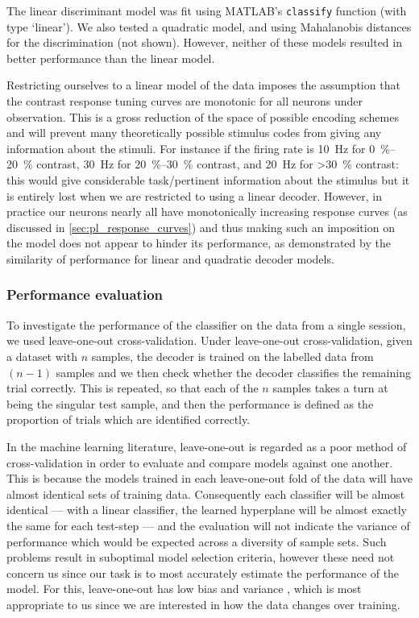 The linear discriminant model was fit using MATLAB's \texttt{classify} function (with type `linear').
We also tested a quadratic model, and using Mahalanobis distances for the discrimination (not shown).
However, neither of these models resulted in better performance than the linear model.

Restricting ourselves to a linear model of the data imposes the assumption that the contrast response tuning curves are monotonic for all neurons under observation.
This is a gross reduction of the space of possible encoding schemes and will prevent many theoretically possible stimulus codes from giving any information about the stimuli.
For instance if the firing rate is \SI{10}{Hz} for \SIrange{0}{20}{\percent} contrast, \SI{30}{Hz} for \SIrange{20}{30}{\percent} contrast, and \SI{20}{Hz} for \SI{>30}{\percent} contrast: this would give considerable task\-/pertinent information about the stimulus but it is entirely lost when we are restricted to using a linear decoder.
However, in practice our neurons nearly all have monotonically increasing response curves (as discussed in \autoref{sec:pl_response_curves}) and thus making such an imposition on the model does not appear to hinder its performance, as demonstrated by the similarity of performance for linear and quadratic decoder models.


\subsubsection{Performance evaluation}
\label{sec:pl_decoder_evaluation}

To investigate the performance of the classifier on the data from a single session, we used leave-one-out cross-validation.
Under leave-one-out cross-validation, given a dataset with $n$ samples, the decoder is trained on the labelled data from $(n-1)$ samples and we then check whether the decoder classifies the remaining trial correctly.
This is repeated, so that each of the $n$ samples takes a turn at being the singular test sample, and then the performance is defined as the proportion of trials which are identified correctly.

In the machine learning literature, leave-one-out is regarded as a poor method of cross-validation in order to evaluate and compare models against one another.
This is because the models trained in each leave-one-out fold of the data will have almost identical sets of training data.
Consequently each classifier will be almost identical --- with a linear classifier, the learned hyperplane will be almost exactly the same for each test-step --- and the evaluation will not indicate the variance of performance which would be expected across a diversity of sample sets.
Such problems result in suboptimal model selection criteria, however these need not concern us since our task is to most accurately estimate the performance of the model.
For this, leave-one-out has low bias and variance \citep{Zhang2015}, which is most appropriate to us since we are interested in how the data changes over training.

